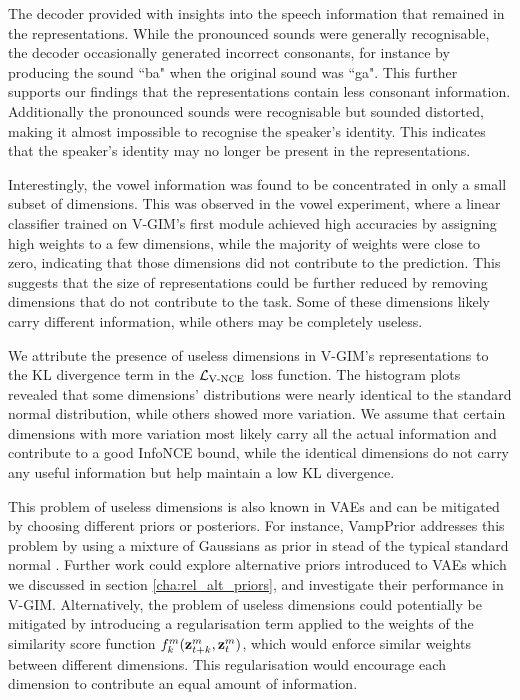 	The decoder provided with insights into the speech information that remained in the representations. While the pronounced sounds were generally recognisable, the decoder occasionally generated incorrect consonants, for instance by producing the sound ``ba" when the original sound was ``ga". This further supports our findings that the representations contain less consonant information. Additionally the pronounced sounds were recognisable but sounded distorted, making it almost impossible to recognise the speaker's identity. This indicates that the speaker's identity may no longer be present in the representations.
	
	Interestingly, the vowel information was found to be concentrated in only a small subset of dimensions. This was observed in the vowel experiment, where a linear classifier trained on V-GIM's first module achieved high accuracies by assigning high weights to a few dimensions, while the majority of weights were close to zero, indicating that those dimensions did not contribute to the prediction. This suggests that the size of representations could be further reduced by removing dimensions that do not contribute to the task. Some of these dimensions likely carry different information, while others may be completely useless.
	
	
	We attribute the presence of useless dimensions in V-GIM's representations to the KL divergence term in the $\mathcal{L}_{\text{V-NCE}}$ loss function. The histogram plots revealed that some dimensions' distributions were nearly identical to the standard normal distribution, while others showed more variation. We assume that certain dimensions with more variation most likely carry all the actual information and contribute to a good InfoNCE bound, while the identical dimensions do not carry any useful information but help maintain a low KL divergence.
	
			
	This problem of useless dimensions is also known in VAEs and can be mitigated by choosing different priors or posteriors. For instance, VampPrior addresses this problem by using a mixture of Gaussians as prior in stead of the typical standard normal \citep{tomczakVAEVampPrior2018}. Further work could explore alternative priors introduced to VAEs which we discussed in section \ref{cha:rel_alt_priors}, and investigate their performance in V-GIM. Alternatively, the problem of useless dimensions could potentially be mitigated by introducing a regularisation term applied to the weights of the similarity score function $f_k^m({\mathbf{z}_{t+k}^m},{\mathbf{z}_t^m})$, which would enforce similar weights between different dimensions. This regularisation would encourage each dimension to contribute an equal amount of information.
	
